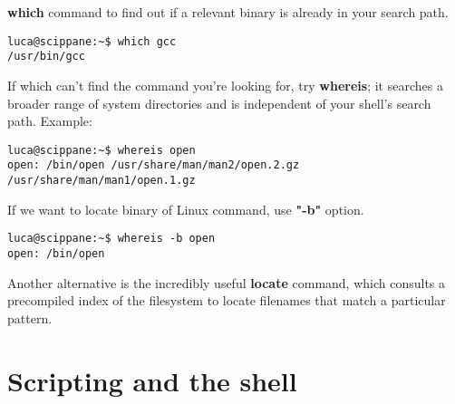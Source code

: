 \documentclass[10pt,letterpaper]{book}
\begin{document}
\textbf{which} command to find out if a relevant binary is already in your search path.
\begin{lstlisting}
luca@scippane:~$ which gcc
/usr/bin/gcc
\end{lstlisting}
If which can't find the command you're looking for, try \textbf{whereis}; it searches a broader range of system directories and is independent of your shell's search path. Example: \\
\begin{lstlisting}
luca@scippane:~$ whereis open
open: /bin/open /usr/share/man/man2/open.2.gz /usr/share/man/man1/open.1.gz
\end{lstlisting}
If we want to locate binary of Linux command, use \textbf{"-b"} option.\\
\begin{lstlisting}
luca@scippane:~$ whereis -b open
open: /bin/open
\end{lstlisting}
Another alternative is the incredibly useful \textbf{locate} command, which consults a precompiled index of the filesystem to locate filenames that match a particular
pattern.
\section{Scripting and the shell}
\end{document}
